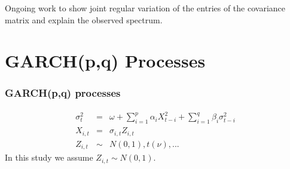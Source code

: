 \documentclass{beamer}
\begin{document}
\begin{frame}
  Ongoing work to show joint regular variation of the entries of
  the covariance matrix and explain the observed spectrum.
\end{frame}
\section{GARCH(p,q) Processes}
\begin{frame}
  \frametitle{GARCH(p,q) processes}  
  \begin{eqnarray*}
    \sigma_{t}^2 &=& \omega + \sum_{i=1}^p \alpha_i X_{t-i}^2 +
    \sum_{i=1}^q \beta_i \sigma_{t-i}^2 \\
    X_{i, t} &=& \sigma_{i, t} Z_{i, t} \\
    Z_{i, t} &\sim& N(0, 1), t(\nu), ...
  \end{eqnarray*}
  In this study we assume $Z_{i, t} \sim N(0,1)$.
\end{frame}
\end{document}
